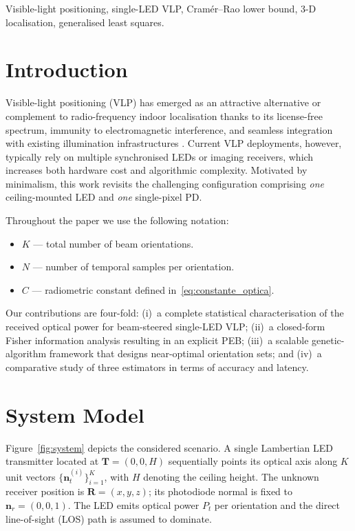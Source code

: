 \documentclass[lettersize,journal]{IEEEtran}
\begin{document}
\begin{IEEEkeywords}
Visible-light positioning, single-LED VLP, Cramér–Rao lower bound, 3-D localisation, generalised least squares.
\end{IEEEkeywords}

\section{Introduction}
Visible-light positioning (VLP) has emerged as an attractive alternative or complement to radio-frequency indoor localisation thanks to its license-free spectrum, immunity to electromagnetic interference, and seamless integration with existing illumination infrastructures \cite{Komine2004,Li2014}. Current VLP deployments, however, typically rely on multiple synchronised LEDs or imaging receivers, which increases both hardware cost and algorithmic complexity.  Motivated by minimalism, this work revisits the challenging configuration comprising 
\emph{one} ceiling-mounted LED and 
\emph{one} single-pixel PD.

Throughout the paper we use the following notation:
\begin{itemize}[leftmargin=*]
    \item $K$ — total number of beam orientations.
    \item $N$ — number of temporal samples per orientation.
    \item $C$ — radiometric constant defined in~\eqref{eq:constante_optica}.
\end{itemize}

Our contributions are four-fold: (i)~a complete statistical characterisation of the received optical power for beam-steered single-LED VLP; (ii)~a closed-form Fisher information analysis resulting in an explicit PEB; (iii)~a scalable genetic-algorithm framework that designs near-optimal orientation sets; and (iv)~a comparative study of three estimators in terms of accuracy and latency.

\section{System Model}
\label{sec:SystemModel}
Figure~\ref{fig:system} depicts the considered scenario. A single Lambertian LED transmitter located at $\mathbf T = (0,0,H)$ sequentially points its optical axis along $K$ unit vectors $\{\mathbf n_t^{(i)}\}_{i=1}^{K}$, with $H$ denoting the ceiling height.  The unknown receiver position is $\mathbf R = (x,y,z)$; its photodiode normal is fixed to $\mathbf n_r = (0,0,1)$.  The LED emits optical power $P_t$ per orientation and the direct line-of-sight (LOS) path is assumed to dominate.
\end{document}
